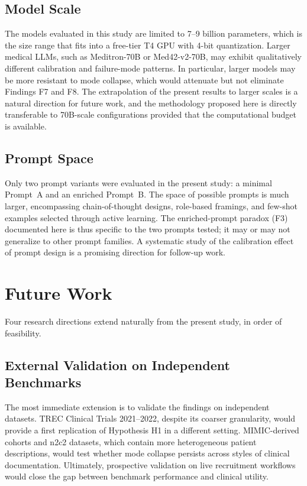 \subsection{Model Scale}
\label{subsec:conc-limitations-scale}

The models evaluated in this study are limited to 7--9 billion 
parameters, which is the size range that fits into a free-tier T4 GPU 
with 4-bit quantization. Larger medical LLMs, such as Meditron-70B or 
Med42-v2-70B, may exhibit qualitatively different calibration and 
failure-mode patterns. In particular, larger models may be more 
resistant to mode collapse, which would attenuate but not eliminate 
Findings F7 and F8. The extrapolation of the present results to larger 
scales is a natural direction for future work, and the methodology 
proposed here is directly transferable to 70B-scale configurations 
provided that the computational budget is available.

\subsection{Prompt Space}
\label{subsec:conc-limitations-prompts}

Only two prompt variants were evaluated in the present study: a 
minimal Prompt~A and an enriched Prompt~B. The space of possible 
prompts is much larger, encompassing chain-of-thought designs, 
role-based framings, and few-shot examples selected through active 
learning. The enriched-prompt paradox (F3) documented here is thus 
specific to the two prompts tested; it may or may not generalize to 
other prompt families. A systematic study of the calibration effect 
of prompt design is a promising direction for follow-up work.

\section{Future Work}
\label{sec:conc-future}

Four research directions extend naturally from the present study, in 
order of feasibility.

\subsection{External Validation on Independent Benchmarks}
\label{subsec:conc-external}

The most immediate extension is to validate the findings on 
independent datasets. TREC Clinical Trials 2021--2022, despite its 
coarser granularity, would provide a first replication of Hypothesis 
H1 in a different setting. MIMIC-derived cohorts and n2c2 datasets, 
which contain more heterogeneous patient descriptions, would test 
whether mode collapse persists across styles of clinical documentation. 
Ultimately, prospective validation on live recruitment workflows would 
close the gap between benchmark performance and clinical utility.

